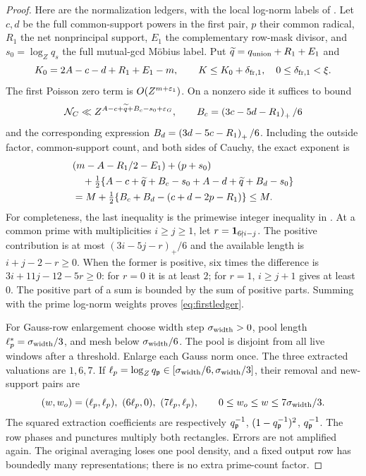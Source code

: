 \begin{proof}
Here are the normalization ledgers, with the local log-norm labels of . Let $c,d$ be the full common-support powers in the first pair, $p$ their common radical, $R_1$ the net nonprincipal support, $E_1$ the complementary row-mask divisor, and $s_0=\log_Z q_s$ the full mutual-gcd Möbius label. Put $\widetilde q=q_{\rm union}+R_1+E_1$ and
\[
 K_0=2A-c-d+R_1+E_1-m,\qquad K\le K_0+\delta_{{\rm fr},1},
 \quad0\le\delta_{{\rm fr},1}<\xi.
\]
The first Poisson zero term is $O(Z^{m+\varepsilon_1})$. On a nonzero side it suffices to bound
\[
 \mathcal N_C\ll Z^{A-c+\widetilde q+B_c-s_0+\varepsilon_G},
 \qquad B_c=\left(3c-5d-R_1\right)_+/6
\]
and the corresponding expression $B_d=\left(3d-5c-R_1\right)_+/6$. Including the outside factor, common-support count, and both sides of Cauchy, the exact exponent is
\begin{align}
 &(m-A-R_1/2-E_1)+(p+s_0)\notag\\
 &\quad+\tfrac12\{A-c+\widetilde q+B_c-s_0+
                         A-d+\widetilde q+B_d-s_0\}\notag\\
 &=M+\tfrac12\{B_c+B_d-(c+d-2p-R_1)\}\le M.\label{eq:firstledger}
\end{align}
For completeness, the last inequality is the primewise integer inequality in . At a common prime with multiplicities $i\ge j\ge1$, let $r=\mathbf 1_{6\nmid i-j}$. The positive contribution is at most $(3i-5j-r)_+/6$ and the available length is $i+j-2-r\ge0$. When the former is positive, six times the difference is $3i+11j-12-5r\ge0$: for $r=0$ it is at least $2$; for $r=1$, $i\ge j+1$ gives at least $0$. The positive part of a sum is bounded by the sum of positive parts. Summing with the prime log-norm weights proves \eqref{eq:firstledger}.

For Gauss-row enlargement choose width step $\sigma_{\rm width}>0$, pool length $\ell_p^*=\sigma_{\rm width}/3$, and mesh below $\sigma_{\rm width}/6$. The pool is disjoint from all live windows after a threshold. Enlarge each Gauss norm once. The three extracted valuations are $1,6,7$. If $\ell_p=\log_Zq_\mathfrak p\in[\sigma_{\rm width}/6,\sigma_{\rm width}/3]$, their removal and new-support pairs are
\[
 (w,w_o)=(\ell_p,\ell_p),\ (6\ell_p,0),\ (7\ell_p,\ell_p),
 \qquad0\le w_o\le w\le7\sigma_{\rm width}/3.
\]
The squared extraction coefficients are respectively $q_\mathfrak p^{-1}$, $(1-q_\mathfrak p^{-1})^2$, $q_\mathfrak p^{-1}$. The row phases and punctures multiply both rectangles. Errors are not amplified again. The original averaging loses one pool density, and a fixed output row has boundedly many representations; there is no extra prime-count factor.


\end{proof}
